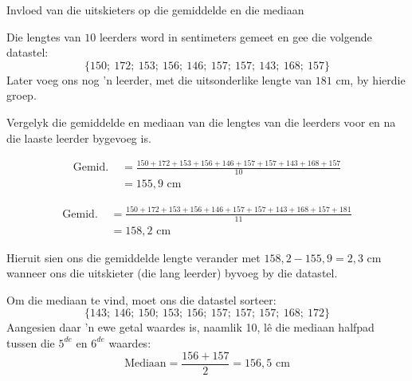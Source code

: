 \clearpage
\begin{wex}{Invloed van die uitskieters op die gemiddelde en die mediaan}
{Die lengtes van $10$ leerders word in sentimeters gemeet en gee die volgende datastel:
    \begin{equation*}
      \{150;\ 172;\ 153;\ 156;\ 146;\ 157;\ 157;\ 143;\ 168;\ 157\}
    \end{equation*}
    Later voeg ons nog ’n leerder, met die uitsonderlike lengte van $181$ cm, by hierdie groep.

   Vergelyk die gemiddelde en mediaan van die lengtes van die leerders voor en na die laaste leerder bygevoeg is.
}{

  \begin{align*}
    
\mbox{Gemid. } &= \frac{150 + 172 + 153 + 156 + 146 + 157 + 157 + 143 + 168 + 157}{10}\\
    &= 155,9\mbox{ cm}
  \end{align*}


  \begin{align*}
   
\mbox{Gemid. } &= \frac{150 + 172 + 153 + 156 + 146 + 157 + 157 + 143 + 168 + 157 + 181}{11}\\
    &= 158,2\mbox{ cm}
  \end{align*}

  Hieruit sien ons die gemiddelde lengte verander met 
  $158,2 - 155,9 = 2,3\mbox{ cm}$ wanneer ons die uitskieter (die lang leerder) byvoeg by die datastel.


  Om die mediaan te vind, moet ons die datastel sorteer:
  \begin{equation*}
    \{143;\ 146;\ 150;\ 153;\ 156;\ 157;\ 157;\ 157;\ 168;\ 172\}
  \end{equation*}
  Aangesien daar ’n ewe getal waardes is, naamlik 10, lê die mediaan halfpad tussen die $5^{de}$ en $6^{de}$ waardes:
  \begin{equation*}
    \mbox{Mediaan} =\frac{156+157}{2} = 156,5\mbox{ cm}
  \end{equation*}

}
\end{wex}
